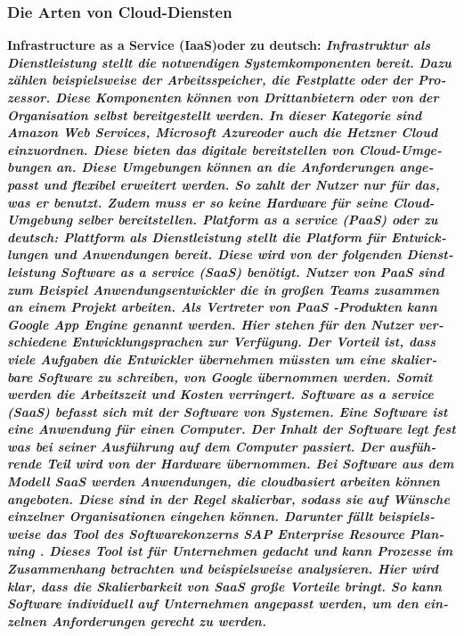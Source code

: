 \begin{otherlanguage}{ngerman}
\subsubsection{Die Arten von Cloud-Diensten}
\bf Infrastructure as a Service (IaaS)\rm oder zu deutsch: \it Infrastruktur als Dienstleistung \rm stellt die notwendigen Systemkomponenten bereit. Dazu zählen beispielsweise der Arbeitsspeicher, die Festplatte oder der Prozessor. Diese Komponenten können von Drittanbietern oder von der Organisation selbst bereitgestellt werden. In dieser Kategorie sind \it Amazon Web Services\rm,  \it Microsoft Azure\rm oder auch die  \it Hetzner Cloud \rm einzuordnen. Diese bieten das digitale bereitstellen von Cloud-Umgebungen an. Diese Umgebungen können an die Anforderungen angepasst und flexibel erweitert werden. So zahlt der Nutzer nur für das, was er benutzt. Zudem muss er so keine Hardware für seine Cloud-Umgebung selber bereitstellen. 
\newline 
\bf Platform as a service (PaaS) \rm  oder zu deutsch: \it Plattform als Dienstleistung \rm stellt die Platform für Entwicklungen und Anwendungen bereit. Diese wird von der folgenden Dienstleistung \it Software as a service (SaaS) \rm benötigt. Nutzer von PaaS sind zum Beispiel Anwendungsentwickler die in großen Teams zusammen an einem Projekt arbeiten. Als Vertreter von \it PaaS \rm -Produkten kann \it Google App Engine \rm genannt werden. Hier stehen für den Nutzer verschiedene Entwicklungsprachen zur Verfügung. Der Vorteil ist, dass viele Aufgaben die Entwickler übernehmen müssten um eine skalierbare Software zu schreiben, von Google übernommen werden. Somit werden die Arbeitszeit und Kosten verringert.
\newline 
\bf Software as a service (SaaS) \rm befasst sich mit der Software von Systemen. Eine Software ist eine Anwendung für einen Computer. Der Inhalt der Software legt fest was bei seiner Ausführung auf dem Computer passiert. Der ausführende Teil wird von der Hardware übernommen. Bei Software aus dem Modell \it SaaS \rm werden Anwendungen, die cloudbasiert arbeiten können angeboten. Diese sind in der Regel skalierbar, sodass sie auf Wünsche einzelner Organisationen eingehen können. Darunter fällt beispielsweise das Tool des Softwarekonzerns SAP \it Enterprise Resource Planning \rm. Dieses Tool ist für Unternehmen gedacht und kann Prozesse im Zusammenhang betrachten und beispielsweise analysieren. Hier wird klar, dass die Skalierbarkeit von \it SaaS \rm große Vorteile bringt. So kann Software individuell auf Unternehmen angepasst werden, um den einzelnen Anforderungen gerecht zu werden. 
\end{otherlanguage}
